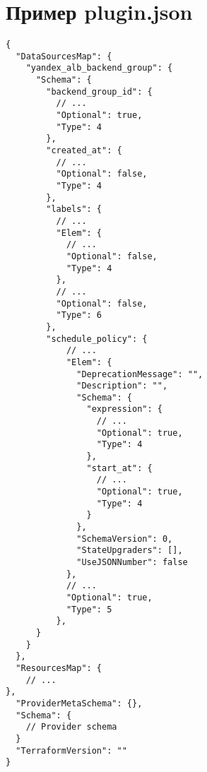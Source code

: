 \chapter{Пример plugin.json}\label{sec:appendix2}

\begin{verbatim}
{
  "DataSourcesMap": {
    "yandex_alb_backend_group": {
      "Schema": {
        "backend_group_id": {
          // ...
          "Optional": true,
          "Type": 4
        },
        "created_at": {
          // ...
          "Optional": false,
          "Type": 4
        },
        "labels": {
          // ...
          "Elem": {
            // ...
            "Optional": false,
            "Type": 4
          },
          // ...
          "Optional": false,
          "Type": 6
        },
        "schedule_policy": {
            // ...
            "Elem": {
              "DeprecationMessage": "",
              "Description": "",
              "Schema": {
                "expression": {
                  // ...
                  "Optional": true,
                  "Type": 4
                },
                "start_at": {
                  // ...
                  "Optional": true,
                  "Type": 4
                }
              },
              "SchemaVersion": 0,
              "StateUpgraders": [],
              "UseJSONNumber": false
            },
            // ...
            "Optional": true,
            "Type": 5
          },
      }
    }
  },
  "ResourcesMap": {
    // ...
},
  "ProviderMetaSchema": {},
  "Schema": {
    // Provider schema
  }
  "TerraformVersion": ""
}
\end{verbatim}

